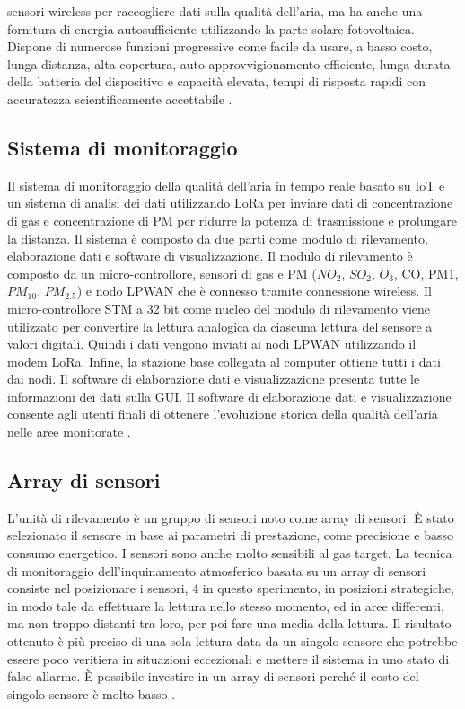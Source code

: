 \documentclass[a4paper]{report} %
\begin{document}
sensori wireless per raccogliere dati sulla qualità dell'aria, ma ha anche una fornitura di energia autosufficiente utilizzando la parte solare fotovoltaica. Dispone di numerose funzioni progressive come facile da usare, a basso costo, lunga distanza, alta copertura, auto-approvvigionamento efficiente, lunga durata della batteria del dispositivo e capacità elevata, tempi di risposta rapidi con accuratezza scientificamente accettabile \cite{art:rif.40}.

\subsection{Sistema di monitoraggio}
Il sistema di monitoraggio della qualità dell'aria in tempo reale basato su IoT e un sistema di analisi dei dati utilizzando LoRa per inviare dati di concentrazione di gas e concentrazione di PM per ridurre la potenza di trasmissione e prolungare la distanza. Il sistema è composto da due parti come modulo di rilevamento, elaborazione dati e software di visualizzazione. Il modulo di rilevamento è composto da un micro-controllore, sensori di gas e PM ($ NO_{2} $, $ SO_{2} $, $ O_{3} $, CO, PM1, $ PM_{10} $, $ PM_{2.5} $) e nodo LPWAN che è connesso tramite connessione wireless. Il micro-controllore STM a 32 bit come nucleo del modulo di rilevamento viene utilizzato per convertire la lettura analogica da ciascuna lettura del sensore a valori digitali. Quindi i dati vengono inviati ai nodi LPWAN utilizzando il modem LoRa. Infine, la stazione base collegata al computer ottiene tutti i dati dai nodi. Il software di elaborazione dati e visualizzazione presenta tutte le informazioni dei dati sulla GUI. Il software di elaborazione dati e visualizzazione consente agli utenti finali di ottenere l'evoluzione storica della qualità dell'aria nelle aree monitorate \cite{art:rif.40}.

\subsection{Array di sensori}
L'unità di rilevamento è un gruppo di sensori noto come array di sensori. È stato selezionato il sensore in base ai parametri di prestazione, come precisione e basso consumo energetico. I sensori sono anche molto sensibili al gas target. La tecnica di monitoraggio dell'inquinamento atmosferico basata su un array di sensori consiste nel posizionare i sensori, 4 in questo sperimento, in posizioni strategiche, in modo tale da effettuare la lettura nello stesso momento, ed in aree differenti, ma non troppo distanti tra loro, per poi fare una media della lettura. Il risultato ottenuto è più preciso di una sola lettura data da un singolo sensore che potrebbe essere poco veritiera in situazioni eccezionali e mettere il sistema in uno stato di falso allarme. È possibile investire in un array di sensori perché il costo del singolo sensore è molto basso \cite{art:rif.40}. 
\end{document}
